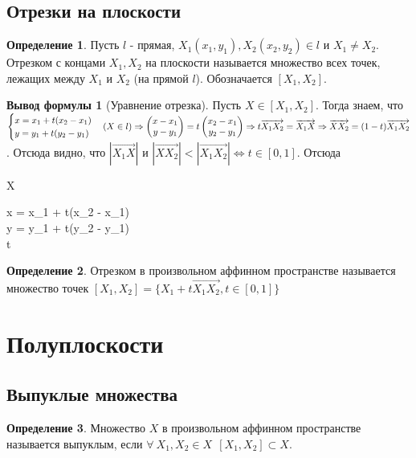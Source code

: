 \documentclass[a4paper, 12pt]{article}
\theoremstyle{definition}
\newtheorem*{definition}{Определение}
\newtheorem*{formula}{Вывод формулы}
\newenvironment{boxedalign*}
  {\begin{equation*}\begin{lrbox}{\boxedalignbox}$\begin{aligned}}
  {\end{aligned}$\end{lrbox}\fbox{\usebox{\boxedalignbox}}\end{equation*}}
\begin{document}
	\subsection{Отрезки на плоскости}
	\begin{definition}
		Пусть $l$ - прямая, $X_{1}(x_{1}, y_{1}), X_{2}(x_{2}, y_{2}) \in l$ и $X_{1} \neq X_{2}$. Отрезком с концами $X_{1}, X_{2}$ на плоскости называется множество всех точек, лежащих между $X_{1}$ и $X_{2}$ (на прямой $l$). Обозначается $[X_{1}, X_{2}]$. 
	\end{definition}
	\begin{formula}[Уравнение отрезка]
		Пусть $X \in [X_{1}, X_{2}]$. Тогда знаем, что $\begin{cases}x = x_{1} + t(x_{2} - x_{1}) \\ y = y_{1} + t(y_{2} - y_{1})\end{cases} (X \in l) \Rightarrow \begin{pmatrix} x-x_{1} \\ y-y_{1} \end{pmatrix} = t\begin{pmatrix} x_{2}-x_{1} \\ y_{2}-y_{1} \end{pmatrix} \Rightarrow \\ t\overrightarrow{X_{1}X_{2}} = \overrightarrow{X_{1}X} \Rightarrow \overrightarrow{XX_{2}} = (1-t)\overrightarrow{X_{1}X_{2}}$. Отсюда видно, что $|\overrightarrow{X_{1}X}|$ и $|\overrightarrow{XX_{2}}| < |\overrightarrow{X_{1}X_{2}}| \Leftrightarrow t \in [0, 1]$. Отсюда \begin{boxedalign*}X \in [X_{1}, X_{2}] \Leftrightarrow \begin{cases}x = x_{1} + t(x_{2} - x_{1}) \\ y = y_{1} + t(y_{2} - y_{1})\\t\in [0, 1]\end{cases}\end{boxedalign*}
	\end{formula}
	\begin{definition}
		Отрезком в произвольном аффинном пространстве называется множество точек $[X_{1}, X_{2}] = \{X_{1} + t\overrightarrow{X_{1}X_{2}}, t\in [0, 1]\}$
	\end{definition}
	\section{Полуплоскости}
	\subsection{Выпуклые множества}
	\begin{definition}
		Множество $X$ в произвольном аффинном пространстве называется выпуклым, если $\forall \ X_{1},X_{2} \in X \ \ [X_{1}, X_{2}] \subset X$. 
	\end{definition}
\end{document}
